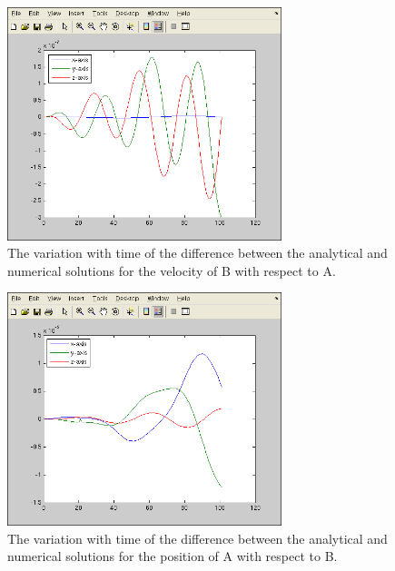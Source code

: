 \begin{description}
 \begin{figure}[!ht]
  \begin{center}
        \includegraphics[width=80mm]{figures/relative6_vba.png}
        \caption{The variation with time of the difference between the analytical and numerical solutions for the velocity of B with respect to A.}
        \label{fig:rel6_4} 
  \end{center}
\end{figure}

 \begin{figure}[!ht]
  \begin{center}
        \includegraphics[width=80mm]{figures/relative7_xab.png}
        \caption{The variation with time of the difference between the analytical and numerical solutions for the position of A with respect to B.}
        \label{fig:rel7_1}
  \end{center}
\end{figure}


\end{description}
